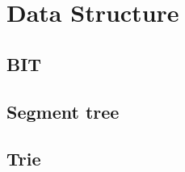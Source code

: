 \section{Data Structure}
        \subsection{BIT}
                
        \subsection{Segment tree}
                
        \subsection{Trie}
                

%                 
%                 
%                   

